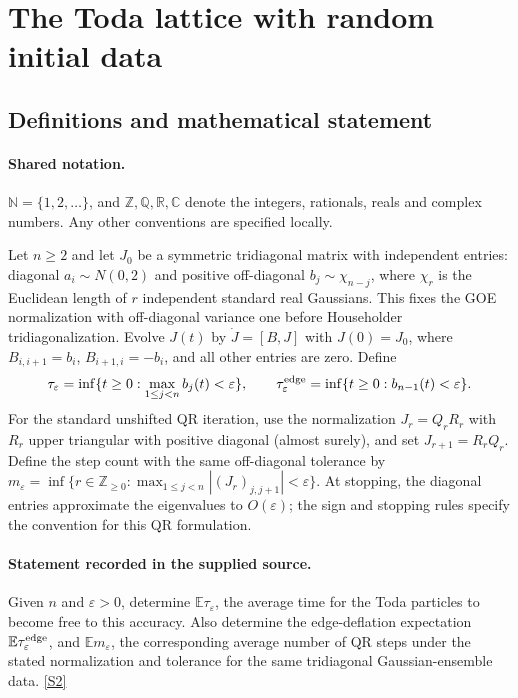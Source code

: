 \documentclass[11pt]{article}
\newcommand{\sref}[2]{\hyperlink{source:#1:#2}{[S#2]}}
\begin{document}
\section{The Toda lattice with random initial data}\label{statement}

\subsection{Definitions and mathematical statement}

\paragraph{Shared notation.}$\mathbb N=\{1,2,\ldots\}$, and $\mathbb Z,\mathbb Q,\mathbb R,\mathbb C$ denote the integers, rationals, reals and complex numbers. Any other conventions are specified locally.


Let $n\ge2$ and let $J_0$ be a symmetric tridiagonal matrix with independent entries: diagonal $a_i\sim N(0,2)$ and positive off-diagonal $b_j\sim\chi_{n-j}$, where $\chi_r$ is the Euclidean length of $r$ independent standard real Gaussians. This fixes the GOE normalization with off-diagonal variance one before Householder tridiagonalization. Evolve $J(t)$ by $\dot J=[B,J]$ with $J(0)=J_0$, where $B_{i,i+1}=b_i$, $B_{i+1,i}=-b_i$, and all other entries are zero. Define \[\tau_\varepsilon=\inf\{t\ge0:\max_{1\le j<n}b_j(t)<\varepsilon\},\qquad \tau_\varepsilon^{\rm edge}=\inf\{t\ge0:b_{n-1}(t)<\varepsilon\}.\] For the standard unshifted QR iteration, use the normalization $J_r=Q_rR_r$ with $R_r$ upper triangular with positive diagonal (almost surely), and set $J_{r+1}=R_rQ_r$. Define the step count with the same off-diagonal tolerance by $m_\varepsilon=\inf\{r\in\mathbb Z_{\ge0}:\max_{1\le j<n}|(J_r)_{j,j+1}|<\varepsilon\}$. At stopping, the diagonal entries approximate the eigenvalues to $O(\varepsilon)$; the sign and stopping rules specify the convention for this QR formulation.
\paragraph{Statement recorded in the supplied source.}
Given $n$ and $\varepsilon>0$, determine $\mathbb E\tau_\varepsilon$, the average time for the Toda particles to become free to this accuracy. Also determine the edge-deflation expectation $\mathbb E\tau_\varepsilon^{\rm edge}$, and $\mathbb E m_\varepsilon$, the corresponding average number of QR steps under the stated normalization and tolerance for the same tridiagonal Gaussian-ensemble data. \sref{statement}{2}
\end{document}
